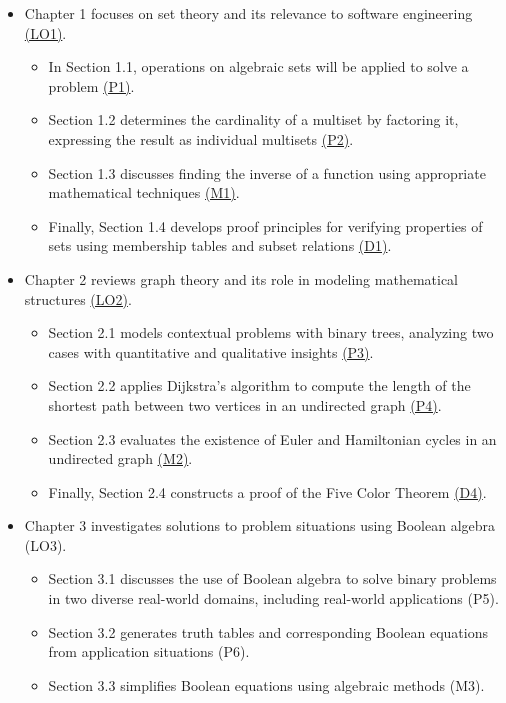 \documentclass[12pt, a4paper]{report} %
\begin{document}
\begin{itemize}
  \item Chapter 1 focuses on set theory and its relevance to software engineering \hyperref[chap:LO1]{(LO1)}.
  \begin{itemize}
    \item In Section 1.1, operations on algebraic sets will be applied to solve a problem \hyperref[sec:P1]{(P1)}.
    \item Section 1.2 determines the cardinality of a multiset by factoring it, expressing the result as individual multisets \hyperref[sec:P1]{(P2)}.
    \item Section 1.3 discusses finding the inverse of a function using appropriate mathematical techniques \hyperref[sec:M1]{(M1)}.
    \item Finally, Section 1.4 develops proof principles for verifying properties of sets using membership tables and subset relations \hyperref[sec:D1]{(D1)}.
  \end{itemize}
  \item Chapter 2 reviews graph theory and its role in modeling mathematical structures \hyperref[chap:LO2]{(LO2)}.
  \begin{itemize}
    \item Section 2.1 models contextual problems with binary trees, analyzing two cases with quantitative and qualitative insights \hyperref[sec:P3]{(P3)}.
    \item Section 2.2 applies Dijkstra's algorithm to compute the length of the shortest path between two vertices in an undirected graph \hyperref[sec:P4]{(P4)}.
    \item Section 2.3 evaluates the existence of Euler and Hamiltonian cycles in an undirected graph \hyperref[sec:M2]{(M2)}.
    \item Finally, Section 2.4 constructs a proof of the Five Color Theorem \hyperref[sec:D4]{(D4)}.
  \end{itemize}
  \item Chapter 3 investigates solutions to problem situations using Boolean algebra (LO3).
  \begin{itemize}
    \item Section 3.1 discusses the use of Boolean algebra to solve binary problems in two diverse real-world domains, including real-world applications (P5).
    \item Section 3.2 generates truth tables and corresponding Boolean equations from application situations (P6).
    \item Section 3.3 simplifies Boolean equations using algebraic methods (M3).

\end{itemize}
\end{itemize}
\end{document}
